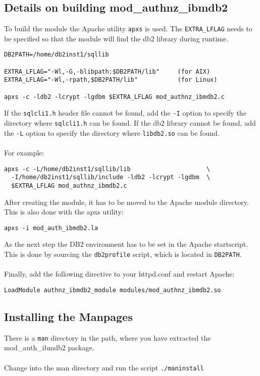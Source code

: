 \documentclass[11pt,a4paper]{article}
\begin{document}
\subsection{Details on building mod\_authnz\_ibmdb2}
To build the module the Apache utility {\tt apxs} is used. The {\tt EXTRA\_LFLAG} needs to be specified so that the module will find the db2 library during runtime.
\begin{verbatim}
DB2PATH=/home/db2inst1/sqllib

EXTRA_LFLAG="-Wl,-G,-blibpath:$DB2PATH/lib"     (for AIX)
EXTRA_LFLAG="-Wl,-rpath,$DB2PATH/lib"           (for Linux)

apxs -c -ldb2 -lcrypt -lgdbm $EXTRA_LFLAG mod_authnz_ibmdb2.c
\end{verbatim}
If the {\tt sqlcli1.h} header file cannot be found, add the {\tt -I} option to specify the
directory where {\tt sqlcli1.h} can be found.
If the db2 library cannot be found, add the {\tt -L} option to specify the
directory where {\tt libdb2.so} can be found.\\
\\
For example:
\begin{verbatim}
apxs -c -L/home/db2inst1/sqllib/lib                     \
  -I/home/db2inst1/sqllib/include -ldb2 -lcrypt -lgdbm  \
  $EXTRA_LFLAG mod_authnz_ibmdb2.c
\end{verbatim}
After creating the module, it has to be moved to the Apache module directory. This is also done with the apxs utility:
\begin{verbatim}
apxs -i mod_auth_ibmdb2.la
\end{verbatim}
As the next step the DB2 environment has to be set in the Apache startscript. This is done by sourcing the {\tt db2profile} script, which is located in {\tt DB2PATH}.\\
\\
Finally, add the following directive to your httpd.conf and restart Apache:
\begin{verbatim}
LoadModule authnz_ibmdb2_module modules/mod_authnz_ibmdb2.so
\end{verbatim}

\subsection{Installing the Manpages}
There is a {\tt man} directory in the path, where you have extracted the mod\_auth\_ibmdb2 package.\\ 
\\
Change into the man directory and run the script {\tt ./maninstall} 
\newpage
\end{document}
